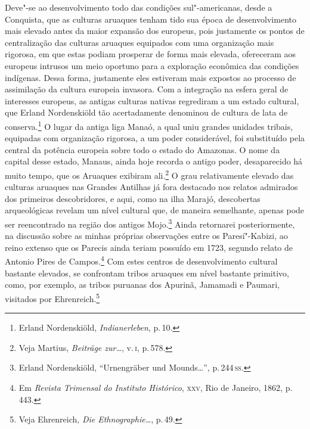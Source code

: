 Deve"-se ao desenvolvimento todo das condições sul"-americanas, desde a
Conquista, que as culturas aruaques tenham tido sua época de desenvolvimento
mais elevado antes da maior expansão dos europeus, pois justamente os
pontos de centralização das culturas aruaques equipados com uma
organização mais rigorosa, em que estas podiam prosperar de forma mais
elevada, ofereceram aos europeus intrusos um meio oportuno para a
exploração econômica das condições indígenas. Dessa forma, justamente
eles estiveram mais expostos ao processo de assimilação da cultura
europeia invasora. Com a integração na esfera geral de interesses
europeus, as antigas culturas nativas regrediram a um estado cultural,
que Erland Nordenskiöld tão acertadamente denominou de cultura de lata
de conserva.\footnote{Erland Nordenskiöld, \textit{Indianerleben}, p.\,10.} O lugar da antiga liga Manaó, a
qual uniu grandes unidades tribais, equipadas com organização rigorosa,
a um poder considerável, foi substituído pela central da potência
europeia sobre todo o estado do Amazonas. O nome da capital desse
estado, Manaus, ainda hoje recorda o antigo poder, desaparecido há muito
tempo, que os Aruaques exibiram ali.\footnote{Veja Martius, \textit{Beiträge
  zur\ldots}, v.\,\textsc{i}, p.\,578.} O grau relativamente elevado das culturas aruaques nas Grandes
Antilhas já fora destacado nos relatos admirados dos primeiros
descobridores, e aqui, como na ilha Marajó, descobertas arqueológicas
revelam um nível cultural que, de maneira semelhante, apenas pode ser
reencontrado na região dos antigos Mojo.\footnote{Erland Nordenskiöld,
  ``Urnengräber und Mounds\ldots'', p.\,244\,\textsc{ss}.} Ainda retornarei posteriormente, na discussão sobre as minhas
próprias observações entre os Paresí"-Kabizi, ao reino extenso que os
Parecis ainda teriam possuído em 1723, segundo relato de Antonio Pires
de Campos.\footnote{Em \textit{Revista Trimensal do Instituto Histórico}, \textsc{xxv},
  Rio de Janeiro, 1862, p.\,443.} Com estes centros de desenvolvimento
cultural bastante elevados, se confrontam tribos aruaques em nível
bastante primitivo, como, por exemplo, as tribos puruanas dos Apurinã,
Jamamadi e Paumari, visitados por Ehrenreich.\footnote{Veja Ehrenreich,
  \textit{Die Ethnographie\ldots}, p.\,49.}

